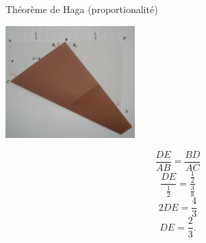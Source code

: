 \documentclass{beamer}
\begin{document}
\begin{frame}{Théorème de Haga (proportionalité)}
    \begin{multicols}{2}

    \begin{center}        
        \includegraphics[width=5cm]{haga_coupe_anote}
    \end{center}

    \begin{equation}
        \frac{ DE }{ AB }=\frac{ BD }{ AC }
    \end{equation}
    \begin{equation}
        \frac{ DE }{ \frac{ 1 }{2} }=\frac{ \frac{ 1 }{2} }{ \frac{ 3 }{ 8 } }
    \end{equation}
    \begin{equation}
        2DE=\frac{ 4 }{ 3 }
    \end{equation}
    \begin{equation}
        DE=\frac{2}{ 3 }.
    \end{equation}
    \end{multicols}

\end{frame}
\end{document}
